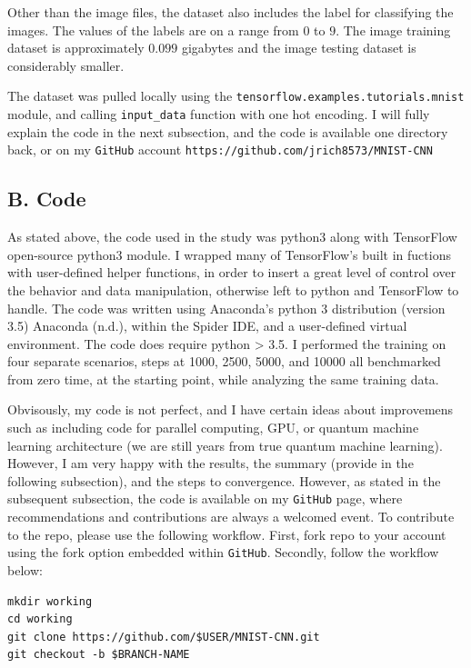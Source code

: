 \documentclass[conference,final,]{IEEEtran}
\begin{document}
Other than the image files, the dataset also includes the label for
classifying the images. The values of the labels are on a range from
\(0\) to \(9\). The image training dataset is approximately \(0.099\)
gigabytes and the image testing dataset is considerably smaller.

The dataset was pulled locally using the
\texttt{tensorflow.examples.tutorials.mnist} module, and calling
\texttt{input\_data} function with one hot encoding. I will fully
explain the code in the next subsection, and the code is available one
directory back, or on my \texttt{GitHub} account
\texttt{https://github.com/jrich8573/MNIST-CNN}

\subsection{B. Code}\label{b.-code}

As stated above, the code used in the study was python3 along with
TensorFlow open-source python3 module. I wrapped many of TensorFlow's
built in fuctions with user-defined helper functions, in order to insert
a great level of control over the behavior and data manipulation,
otherwise left to python and TensorFlow to handle. The code was written
using Anaconda's python 3 distribution (version 3.5) Anaconda (n.d.),
within the Spider IDE, and a user-defined virtual environment. The code
does require python \textgreater{} 3.5. I performed the training on four
separate scenarios, steps at 1000, 2500, 5000, and 10000 all benchmarked
from zero time, at the starting point, while analyzing the same training
data.

Obvisously, my code is not perfect, and I have certain ideas about
improvemens such as including code for parallel computing, GPU, or
quantum machine learning architecture (we are still years from true
quantum machine learning). However, I am very happy with the results,
the summary (provide in the following subsection), and the steps to
convergence. However, as stated in the subsequent subsection, the code
is available on my \texttt{GitHub} page, where recommendations and
contributions are always a welcomed event. To contribute to the repo,
please use the following workflow. First, fork repo to your account
using the fork option embedded within \texttt{GitHub}. Secondly, follow
the workflow below:

\begin{verbatim}
mkdir working               
cd working              
git clone https://github.com/$USER/MNIST-CNN.git                
git checkout -b $BRANCH-NAME
\end{verbatim}
\end{document}
